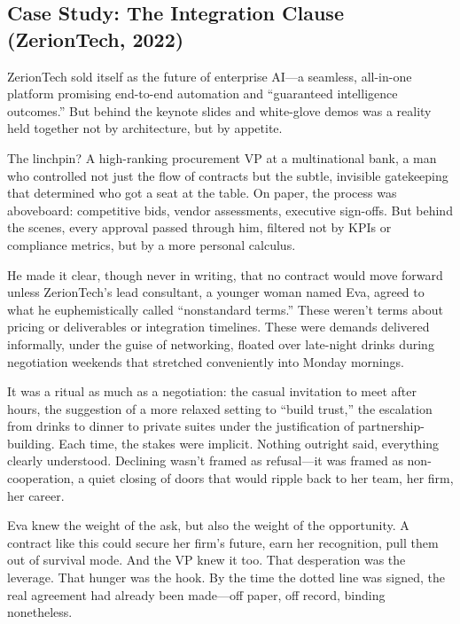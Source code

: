 \subsection{Case Study: The Integration Clause (ZerionTech, 2022)}

ZerionTech sold itself as the future of enterprise AI—a seamless, all-in-one platform promising end-to-end automation and “guaranteed intelligence outcomes.” But behind the keynote slides and white-glove demos was a reality held together not by architecture, but by appetite.

The linchpin? A high-ranking procurement VP at a multinational bank, a man who controlled not just the flow of contracts but the subtle, invisible gatekeeping that determined who got a seat at the table. On paper, the process was aboveboard: competitive bids, vendor assessments, executive sign-offs. But behind the scenes, every approval passed through him, filtered not by KPIs or compliance metrics, but by a more personal calculus.

He made it clear, though never in writing, that no contract would move forward unless ZerionTech’s lead consultant, a younger woman named Eva, agreed to what he euphemistically called “nonstandard terms.” These weren’t terms about pricing or deliverables or integration timelines. These were demands delivered informally, under the guise of networking, floated over late-night drinks during negotiation weekends that stretched conveniently into Monday mornings.

It was a ritual as much as a negotiation: the casual invitation to meet after hours, the suggestion of a more relaxed setting to “build trust,” the escalation from drinks to dinner to private suites under the justification of partnership-building. Each time, the stakes were implicit. Nothing outright said, everything clearly understood. Declining wasn’t framed as refusal—it was framed as non-cooperation, a quiet closing of doors that would ripple back to her team, her firm, her career.

Eva knew the weight of the ask, but also the weight of the opportunity. A contract like this could secure her firm’s future, earn her recognition, pull them out of survival mode. And the VP knew it too. That desperation was the leverage. That hunger was the hook. By the time the dotted line was signed, the real agreement had already been made—off paper, off record, binding nonetheless.

